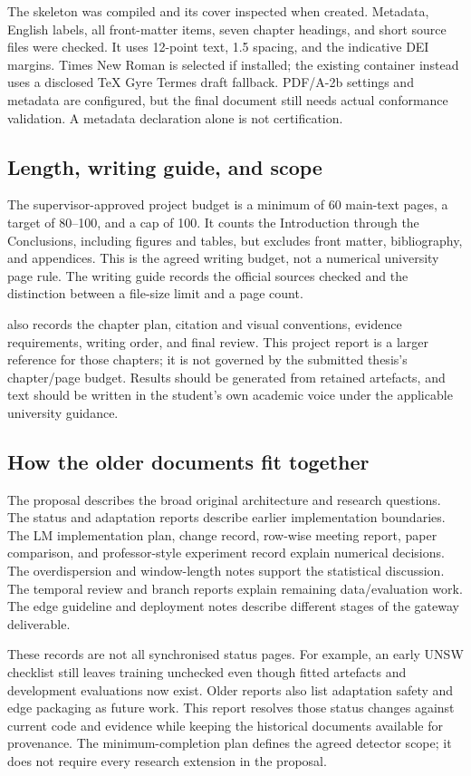 The skeleton was compiled and its cover inspected when created. Metadata,
English labels, all front-matter items, seven chapter headings, and short
source files were checked. It uses 12-point text, 1.5 spacing, and the indicative
DEI margins. Times New Roman is selected if installed; the existing container
instead uses a disclosed TeX Gyre Termes draft fallback. PDF/A-2b settings and
metadata are configured, but the final document still needs actual conformance
validation. A metadata declaration alone is not certification.

\subsection{Length, writing guide, and scope}

The supervisor-approved project budget is a minimum of 60 main-text pages,
a target of 80--100, and a cap of 100. It counts the Introduction through the
Conclusions, including figures and tables, but excludes front matter,
bibliography, and appendices. This is the agreed writing budget, not a numerical
university page rule. The writing guide records the official sources checked
and the distinction between a file-size limit and a page count.

 also records the chapter plan, citation and
visual conventions, evidence requirements, writing order, and final review.
This project report is a larger reference for those chapters; it is not
governed by the submitted thesis's chapter/page budget. Results should be
generated from retained artefacts, and text should be written in the student's
own academic voice under the applicable university guidance.

\subsection{How the older documents fit together}

The proposal describes the broad original architecture and research questions.
The status and adaptation reports describe earlier implementation boundaries.
The LM implementation plan, change record, row-wise meeting report, paper
comparison, and professor-style experiment record explain numerical decisions.
The overdispersion and window-length notes support the statistical discussion.
The temporal review and branch reports explain remaining data/evaluation work.
The edge guideline and deployment notes describe different stages of the
gateway deliverable.

These records are not all synchronised status pages. For example, an early UNSW
checklist still leaves training unchecked even though fitted artefacts and
development evaluations now exist. Older reports also list adaptation safety
and edge packaging as future work. This report resolves those status changes
against current code and evidence while keeping the historical documents
available for provenance. The minimum-completion plan defines the agreed
detector scope; it does not require every research extension in the proposal.
